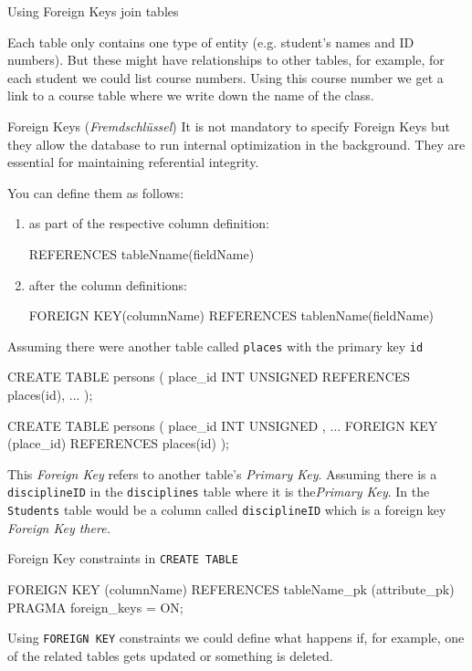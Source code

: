 \begin{frame}{Using Foreign Keys join tables}
\footnotesize

Each table only contains one type of entity (e.g. student's names and ID numbers). But these might have relationships to other tables, for example, for each student we could list course numbers. Using this course number we get a link to a course table where we write down the name of the class.


\begin{alertblock}{Foreign Keys (\emph{Fremdschlüssel})}
\footnotesize
It is not mandatory to specify Foreign Keys but they allow the database to run internal optimization in the background. They are essential for maintaining referential integrity. 

You can define them as follows:
\begin{enumerate}
    \item as part of the respective column definition:
\begin{sqlcode}
REFERENCES tableNname(fieldName)
\end{sqlcode}
    \item after the column definitions:
\begin{sqlcode}
FOREIGN KEY(columnName) REFERENCES tablenName(fieldName)
\end{sqlcode}
\end{enumerate}
\end{alertblock}

\framebreak 
Assuming there were another table called \texttt{places}
with the primary key \texttt{id}
\begin{sqlcode}
CREATE TABLE persons (
  place_id INT UNSIGNED REFERENCES places(id),
  ...
);

CREATE TABLE persons (
  place_id INT UNSIGNED ,
  ...
  FOREIGN KEY (place_id) REFERENCES places(id)
);
\end{sqlcode}
\framebreak 

This \emph{Foreign Key} refers to another table's \emph{Primary Key}. 
Assuming there is a \texttt{disciplineID} in the \texttt{disciplines} table where it is the\emph{Primary Key}. 
In the \texttt{Students} table would be a column called \texttt{disciplineID} which is a foreign key \emph{Foreign Key there.}


\begin{block}{Foreign Key constraints in \texttt{CREATE TABLE}}
\begin{sqlcode}
FOREIGN KEY (columnName) 
REFERENCES tableName_pk (attribute_pk)
PRAGMA foreign_keys = ON;
\end{sqlcode}
\end{block}

Using \texttt{FOREIGN KEY} constraints we could define what happens if, for example, one of the related tables gets updated or something is deleted. 
\end{frame}

